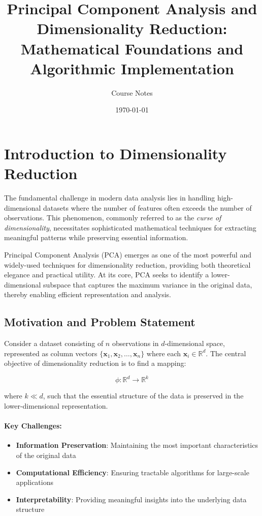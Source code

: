 \documentclass[12pt]{article}
\title{Principal Component Analysis and Dimensionality Reduction:\\
Mathematical Foundations and Algorithmic Implementation}
\author{Course Notes}
\date{\today}
\renewcommand{\vec}[1]{\mathbf{#1}}
\begin{document}
\maketitle

\tableofcontents
\newpage


\section{Introduction to Dimensionality Reduction}

The fundamental challenge in modern data analysis lies in handling high-dimensional datasets where the number of features often exceeds the number of observations. This phenomenon, commonly referred to as the \textit{curse of dimensionality}, necessitates sophisticated mathematical techniques for extracting meaningful patterns while preserving essential information.

Principal Component Analysis (PCA) emerges as one of the most powerful and widely-used techniques for dimensionality reduction, providing both theoretical elegance and practical utility. At its core, PCA seeks to identify a lower-dimensional subspace that captures the maximum variance in the original data, thereby enabling efficient representation and analysis.

\subsection{Motivation and Problem Statement}

Consider a dataset consisting of $n$ observations in $d$-dimensional space, represented as column vectors $\{\vec{x}_1, \vec{x}_2, \ldots, \vec{x}_n\}$ where each $\vec{x}_i \in \mathbb{R}^d$. The central objective of dimensionality reduction is to find a mapping:

\begin{equation}
    \phi: \mathbb{R}^d \rightarrow \mathbb{R}^k
\end{equation}

where $k \ll d$, such that the essential structure of the data is preserved in the lower-dimensional representation.

\paragraph{Key Challenges:}
\begin{itemize}[noitemsep]
    \item \textbf{Information Preservation}: Maintaining the most important characteristics of the original data
    \item \textbf{Computational Efficiency}: Ensuring tractable algorithms for large-scale applications
    \item \textbf{Interpretability}: Providing meaningful insights into the underlying data structure
\end{itemize}
\end{document}
